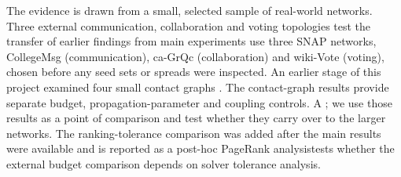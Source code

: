 \documentclass[smallextended]{svjour3}
\providecommand{\DIFaddtex}[1]{{\protect\color{blue} \sf #1}} %
\providecommand{\DIFdeltex}[1]{{\protect\color{red} \scriptsize #1}} %
\providecommand{\DIFaddbegin}{} %
\providecommand{\DIFaddend}{} %
\providecommand{\DIFdelbegin}{} %
\providecommand{\DIFdelend}{} %
\providecommand{\DIFadd}[1]{\texorpdfstring{\DIFaddtex{#1}}{#1}} %
\providecommand{\DIFdel}[1]{\texorpdfstring{\DIFdeltex{#1}}{}} %
\providecommand{\DIFscaledelfig}{0.5}
\newlength{\DIFdelgraphicswidth} %
\newlength{\DIFdelgraphicsheight} %
\providecommand{\DIFaddincludegraphics}[2][]{{\color{blue}\fbox{\DIFOincludegraphics[#1]{#2}}}} %
\providecommand{\DIFdelincludegraphics}[2][]{%
\sbox{\DIFdelgraphicsbox}{\DIFOincludegraphics[#1]{#2}}%
\settoboxwidth{\DIFdelgraphicswidth}{\DIFdelgraphicsbox} %
\settoboxtotalheight{\DIFdelgraphicsheight}{\DIFdelgraphicsbox} %
\scalebox{\DIFscaledelfig}{%
\parbox[b]{\DIFdelgraphicswidth}{\usebox{\DIFdelgraphicsbox}\\[-\baselineskip] \rule{\DIFdelgraphicswidth}{0em}}\llap{\resizebox{\DIFdelgraphicswidth}{\DIFdelgraphicsheight}{%
\setlength{\unitlength}{\DIFdelgraphicswidth}%
\begin{picture}(1,1)%
\thicklines\linethickness{2pt} %
{\color[rgb]{1,0,0}\put(0,0){\framebox(1,1){}}}%
{\color[rgb]{1,0,0}\put(0,0){\line( 1,1){1}}}%
{\color[rgb]{1,0,0}\put(0,1){\line(1,-1){1}}}%
\end{picture}%
}\hspace*{3pt}}} %
} %
\DeclareRobustCommand{\DIFaddbegin}{\DIFOaddbegin \let\includegraphics\DIFaddincludegraphics} %
\DeclareRobustCommand{\DIFaddend}{\DIFOaddend \let\includegraphics\DIFOincludegraphics} %
\DeclareRobustCommand{\DIFdelbegin}{\DIFOdelbegin \let\includegraphics\DIFdelincludegraphics} %
\DeclareRobustCommand{\DIFdelend}{\DIFOaddend \let\includegraphics\DIFOincludegraphics} %
\begin{document}
The \DIFdelbegin \DIFdel{evidence is drawn from a small, selected sample of real-world networks. Three external communication, collaboration and voting topologies test the transfer of earlier findings from }\DIFdelend \DIFaddbegin \DIFadd{main experiments use three SNAP networks, CollegeMsg (communication), ca-GrQc (collaboration) and wiki-Vote (voting), chosen before any seed sets or spreads were inspected. An earlier stage of this project examined }\DIFaddend four small contact graphs\DIFdelbegin \DIFdel{. The contact-graph results provide separate budget, propagation-parameter and coupling controls. A }\DIFdelend \DIFaddbegin \DIFadd{; we use those results as a point of comparison and test whether they carry over to the larger networks. The ranking-tolerance comparison was added after the main results were available and is reported as a }\DIFaddend post-hoc \DIFdelbegin \DIFdel{PageRank analysistests whether the external budget comparison depends on solver tolerance}\DIFdelend \DIFaddbegin \DIFadd{analysis}\DIFaddend .
\end{document}
